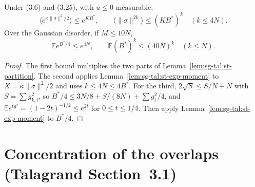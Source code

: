 \begin{lemma}\label{lem:sg-tal:st-moments}
  \leanok
Under (3.6) and (3.25), with $u\le0$ measurable,
\[
\langle e^{\kappa\|\sigma\|^2/2}\rangle\le e^{KB^*},\qquad
\langle\|\sigma\|^{2k}\rangle\le(KB^*)^k\quad(k\le4N).
\]
Over the Gaussian disorder, if $M\le10N$,
\[
\mathbb Ee^{B^*/4}\le e^{4N},\qquad\mathbb E(B^*)^k\le(40N)^k\quad(k\le N).
\]
\end{lemma}
\begin{proof}
  \leanok
The first bound multiplies the two parts of Lemma~\ref{lem:sg-tal:st-partition}. The second applies
Lemma~\ref{lem:sg-tal:st-exp-moment} to $X=\kappa\|\sigma\|^2/2$ and uses $k\le4N\le4B^*$. For the third,
$2\sqrt S\le S/N+N$ with $S=\sum g_{k,i}^2$, so $B^*/4\le3N/8+S/(8N)+\sum g_i^2/4$, and
$\mathbb Ee^{tg^2}=(1-2t)^{-1/2}\le e^{2t}$ for $0\le t\le1/4$. Then apply
Lemma~\ref{lem:sg-tal:st-exp-moment} to $B^*/4$.
\end{proof}

\section{Concentration of the overlaps (Talagrand Section~3.1)}\label{sec:sg-tal:st-overlaps}

